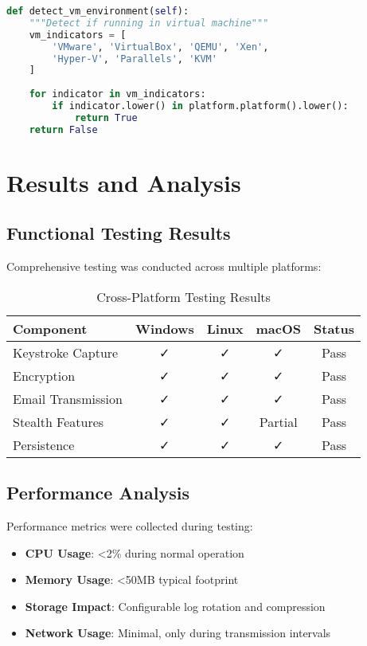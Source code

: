 \documentclass[12pt,a4paper]{article}
\begin{document}
\begin{lstlisting}[language=Python, caption=VM Detection Implementation]
def detect_vm_environment(self):
    """Detect if running in virtual machine"""
    vm_indicators = [
        'VMware', 'VirtualBox', 'QEMU', 'Xen',
        'Hyper-V', 'Parallels', 'KVM'
    ]
    
    for indicator in vm_indicators:
        if indicator.lower() in platform.platform().lower():
            return True
    return False
\end{lstlisting}

\section{Results and Analysis}

\subsection{Functional Testing Results}

Comprehensive testing was conducted across multiple platforms:

\begin{table}[H]
\centering
\begin{tabular}{@{}lcccc@{}}
\toprule
\textbf{Component} & \textbf{Windows} & \textbf{Linux} & \textbf{macOS} & \textbf{Status} \\
\midrule
Keystroke Capture & ✓ & ✓ & ✓ & Pass \\
Encryption & ✓ & ✓ & ✓ & Pass \\
Email Transmission & ✓ & ✓ & ✓ & Pass \\
Stealth Features & ✓ & ✓ & Partial & Pass \\
Persistence & ✓ & ✓ & ✓ & Pass \\
\bottomrule
\end{tabular}
\caption{Cross-Platform Testing Results}
\label{tab:testing}
\end{table}

\subsection{Performance Analysis}

Performance metrics were collected during testing:

\begin{itemize}
    \item \textbf{CPU Usage}: <2\% during normal operation
    \item \textbf{Memory Usage}: <50MB typical footprint
    \item \textbf{Storage Impact}: Configurable log rotation and compression
    \item \textbf{Network Usage}: Minimal, only during transmission intervals
\end{itemize}
\end{document}
